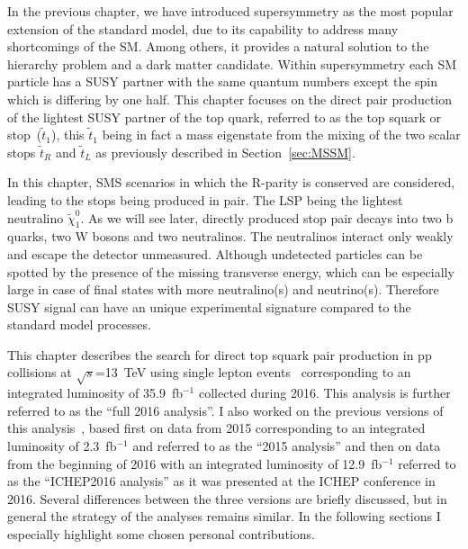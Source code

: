 \clearpage

\setcounter{secnumdepth}{4}
\setcounter{secnumdepth}{4}


In the previous chapter, we have introduced  supersymmetry as the most popular extension of the standard model, due to its capability to address many shortcomings of the SM. Among others, it provides a natural solution to the hierarchy problem and a dark matter candidate. Within supersymmetry each SM particle has a SUSY partner with the same quantum numbers except the spin which is differing by one half. This chapter focuses on the direct pair production of the lightest SUSY partner of the top quark, referred to as the top squark or stop~($\tilde{t}_{1}$), this $\tilde{t}_{1}$ being in fact a mass eigenstate  from the mixing of the two scalar stops $\tilde{t}_{R}$ and  $\tilde{t}_{L}$ as previously described in Section~\ref{sec:MSSM}.


In this chapter, SMS scenarios in which the R-parity is conserved are considered, leading to  the stops being produced in pair. The LSP being the lightest neutralino $\tilde{\chi}^{0}_{1}$. As we will see later, directly produced stop pair decays into two b quarks, two W bosons and two neutralinos. The neutralinos interact only weakly and escape the detector unmeasured. Although undetected particles can be spotted by the presence of the missing transverse energy, which can be especially large in case of final states with more neutralino(s) and neutrino(s). Therefore SUSY signal can have an unique experimental signature compared to the standard model processes.

This chapter describes the search for direct top squark pair production in pp collisions at $\sqrt{s}$=13~TeV using single lepton events~\cite{Sirunyan:2017xse} corresponding to an integrated luminosity of 35.9~fb$^{-1}$ collected during 2016. This analysis is further referred to as the ``full 2016 analysis''.  I also worked on the previous versions of this analysis~\cite{Sirunyan:2016jpr, CMS:2016vew}, based first on data from 2015 corresponding to an integrated luminosity of 2.3~fb$^{-1}$ and referred to as the ``2015 analysis'' and then on data from the beginning of 2016 with an integrated luminosity of 12.9~fb$^{-1}$ referred to as the ``ICHEP2016 analysis'' as it was presented at the ICHEP conference in 2016. Several differences between the three versions are briefly discussed, but in general the strategy of the analyses remains similar. In the following sections I especially highlight some chosen personal contributions.

